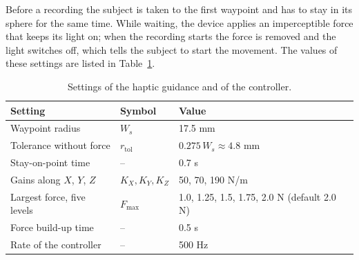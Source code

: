 \documentclass[12pt]{report}
\begin{document}
Before a recording the subject is taken to the first waypoint and has to stay in its sphere for the same time. While waiting, the device applies an imperceptible force that keeps its light on; when the recording starts the force is removed and the light switches off, which tells the subject to start the movement. The values of these settings are listed in Table~\ref{tab:guidance}.

\begin{table}[h!]
    \centering
    \caption{Settings of the haptic guidance and of the controller.}
    \label{tab:guidance}
    \begin{tabular}{lll}
    \toprule
    Setting & Symbol & Value \\
    \midrule
    Waypoint radius & $W_s$ & 17.5 mm \\
    Tolerance without force & $r_{\mathrm{tol}}$ & $0.275\,W_s\approx4.8$ mm \\
    Stay-on-point time & -- & 0.7 s \\
    Gains along $X$, $Y$, $Z$ & $K_X,K_Y,K_Z$ & 50, 70, 190 N/m \\
    Largest force, five levels & $F_{\max}$ & 1.0, 1.25, 1.5, 1.75, 2.0 N (default 2.0 N) \\
    Force build-up time & -- & 0.5 s \\
    Rate of the controller & -- & 500 Hz \\
    \bottomrule
    \end{tabular}
\end{table}
\end{document}

